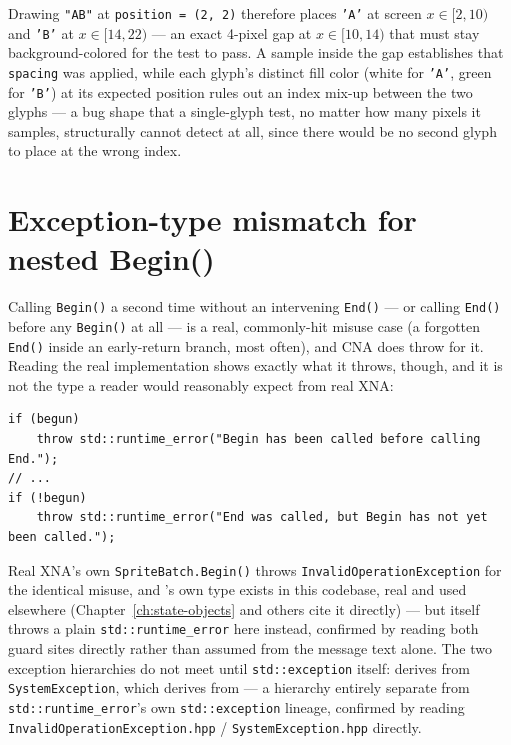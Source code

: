 Drawing \texttt{"AB"} at \texttt{position = (2, 2)} therefore places \texttt{'A'} at screen
$x \in [2, 10)$ and \texttt{'B'} at $x \in [14, 22)$ --- an exact 4-pixel gap at $x \in [10, 14)$
that must stay background-colored for the test to pass. A sample inside the gap establishes that
\texttt{spacing} was applied, while each glyph's distinct fill color (white for \texttt{'A'}, green for
\texttt{'B'}) at its expected position rules out an index mix-up between the two glyphs ---
a bug shape that a single-glyph test, no matter how many pixels it samples, structurally cannot
detect at all, since there would be no second glyph to place at the wrong index.

\section{Exception-type mismatch for nested Begin()}
\label{sec:spritebatch-wrong-exception-type}

Calling \texttt{Begin()} a second time without an intervening \texttt{End()} --- or calling
\texttt{End()} before any \texttt{Begin()} at all --- is a real, commonly-hit misuse case (a
forgotten \texttt{End()} inside an early-return branch, most often), and CNA does throw for it.
Reading the real implementation shows exactly what it throws, though, and it is not the type a
reader would reasonably expect from real XNA:

\begin{lstlisting}
if (begun)
    throw std::runtime_error("Begin has been called before calling End.");
// ...
if (!begun)
    throw std::runtime_error("End was called, but Begin has not yet been called.");
\end{lstlisting}

Real XNA's own \texttt{SpriteBatch.Begin()} throws \texttt{InvalidOperationException} for the
identical misuse, and 's own  type exists in
this codebase, real and used elsewhere (Chapter~\ref{ch:state-objects} and others cite it
directly) --- but  itself throws a plain \texttt{std::runtime\_error}
here instead, confirmed by reading both guard sites directly rather than assumed from the
message text alone. The two exception hierarchies do not meet until \texttt{std::exception}
itself:  derives from \texttt{SystemException}, which
derives from  --- a hierarchy entirely separate from
\texttt{std::runtime\_error}'s own \texttt{std::exception} lineage, confirmed by reading
\texttt{InvalidOperationException.hpp} / \texttt{SystemException.hpp} directly.


